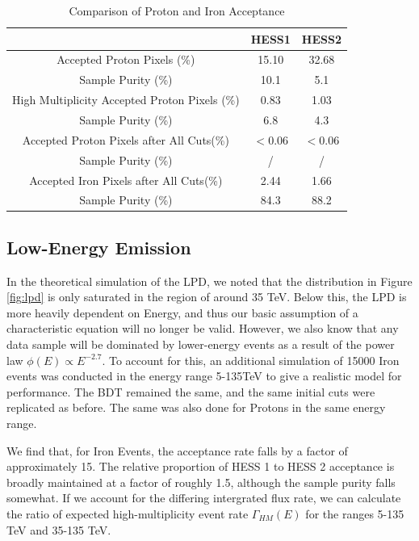 \documentclass[11pt]{article}
\begin{document}
\begin{table}[h!]
  \centering
  \caption{Comparison of Proton and Iron Acceptance}
  \label{tab:protonacceptance}
  \begin{tabular}{ccc}
    \toprule
    & HESS1  & HESS2 \\
    \midrule
    Accepted Proton Pixels (\%) & 15.10 & 32.68\\
    Sample Purity (\%) & 10.1 & 5.1 \\
    \midrule
    High Multiplicity Accepted Proton Pixels (\%) & 0.83 & 1.03\\
    Sample Purity (\%) & 6.8 & 4.3 \\
    \midrule
    Accepted Proton Pixels after All Cuts(\%) & $< 0.06$ & $< 0.06$\\
    Sample Purity (\%) & / & / \\
    \midrule
    Accepted Iron Pixels after All Cuts(\%) & 2.44 & 1.66\\
    Sample Purity (\%) & 84.3 & 88.2 \\
    \bottomrule
  \end{tabular}
\end{table}

\subsection{Low-Energy Emission}
In the theoretical simulation of the LPD, we noted that the distribution in Figure \ref{fig:lpd} is only saturated in the region of around 35 TeV. Below this, the LPD is more heavily dependent on Energy, and thus our basic assumption of a characteristic equation will no longer be valid. However, we also know that any data sample will be dominated by lower-energy events as a result of the power law $\phi(E) \propto E^{-2.7}$. To account for this, an additional simulation of 15000 Iron events was conducted in the energy range 5-135TeV to give a realistic model for performance. The BDT remained the same, and the same initial cuts were replicated as before. The same was also done for Protons in the same energy range. 

We find that, for Iron Events, the acceptance rate falls by a factor of approximately 15. The relative proportion of HESS 1 to HESS 2 acceptance is broadly maintained at a factor of roughly 1.5, although the sample purity falls somewhat. If we account for the differing intergrated flux rate, we can calculate the ratio of expected high-multiplicity event rate $\Gamma_{HM}(E)$ for the ranges 5-135 TeV and 35-135 TeV.
\end{document}
